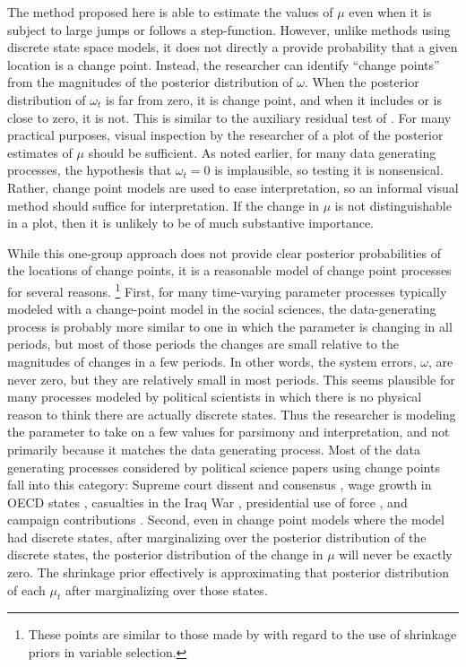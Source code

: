 The method proposed here is able to estimate the values of $\mu$ even when it is subject to large jumps or follows a step-function. 
However, unlike methods using discrete state space models, it does not directly a provide probability that a given location is a change point.
Instead, the researcher can identify ``change points'' from the magnitudes of the posterior distribution of $\omega$.
When the posterior distribution of $\omega_{t}$ is far from zero, it is change point, and when it includes or is close to zero, it is not.
This is similar to the auxiliary residual test of \textcite{DeJongPenzer1998}.
For many practical purposes, visual inspection by the researcher of a plot of the posterior estimates of $\mu$ should be sufficient.
As noted earlier, for many data generating processes, the hypothesis that $\omega_{t} = 0$ is implausible, so testing it is nonsensical.
Rather, change point models are used to ease interpretation, so an informal visual method should suffice for interpretation.
If the change in $\mu$ is not distinguishable in a plot, then it is unlikely to be of much substantive importance.

While this one-group approach does not provide clear posterior probabilities of the locations of change points, it is a reasonable model of change point processes for several reasons.%
\footnote{These points are similar to those made by \textcite[2-3]{PolsonScott2012} with regard to the use of shrinkage priors in variable selection.}
First, for many time-varying parameter processes typically modeled with a change-point model in the social sciences, the data-generating process is probably more similar to one in which the parameter is changing in all periods, but most of those periods the changes are small relative to the magnitudes of changes in a few periods.
In other words, the system errors, $\omega$, are never zero, but they are relatively small in most periods.
This seems plausible for many processes modeled by political scientists in which there is no physical reason to think there are actually discrete states.
Thus the researcher is modeling the parameter to take on a few values for parsimony and interpretation, and not primarily because it matches the data generating process.
Most of the data generating processes considered by political science papers using change points fall into this category: Supreme court dissent and consensus \parencite{CalderiaZorn1998}, wage growth in OECD states \parencite{WesternKleykamp2004}, casualties in the Iraq War \parencite{Spirling2007a}, presidential use of force \parencite{Park2010}, and campaign contributions \parencite{Blackwell2012}.
Second, even in change point models where the model had discrete states, after marginalizing over the posterior distribution of the discrete states, the posterior distribution of the change in $\mu$ will never be exactly zero.
The shrinkage prior effectively is approximating that posterior distribution of each $\mu_{t}$ after marginalizing over those states.



